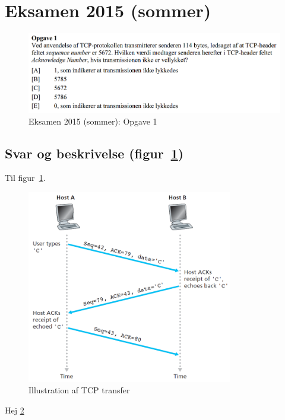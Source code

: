 \newcommand\argang{Eksamen 2015 (sommer)}
\section{\argang}

\begin{figure}[H]
	\centering
	\includegraphics[width=\linewidth]{figs/sommer15/SE15OP1}
	\caption{\argang: Opgave 1}
	\label{fig:SE15OP1}
\end{figure}

\subsection{Svar og beskrivelse (figur~\ref{fig:SE15OP1})}
Til figur~\ref{fig:SE15OP1}.
\derp

\begin{figure}[H]
	\centering
	\includegraphics[width=0.8\textwidth]{figs/sommer15/tcptransfer}
	\caption{Illustration af TCP transfer}
	\label{fig:TCPtransfer}
\end{figure}

Hej \ref{fig:TCPtransfer}

